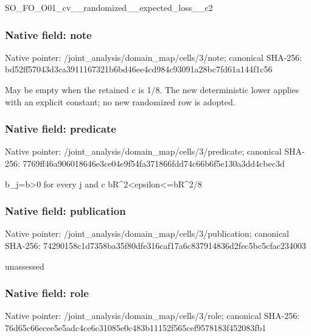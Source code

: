 \documentclass[10pt,a4paper]{article}
\begin{document}
\begingroup\raggedright\sloppy SO\_\allowbreak{}FO\_\allowbreak{}O01\_\allowbreak{}cv\_\allowbreak{}\_\allowbreak{}randomized\_\allowbreak{}\_\allowbreak{}expected\_\allowbreak{}loss\_\allowbreak{}\_\allowbreak{}c2\par\endgroup

\subsubsection{Native field: note}
Native pointer: /joint\_\allowbreak{}analysis/domain\_\allowbreak{}map/cells/3/note; canonical SHA-256: bd52ff57043d3ca3911167321b6bd46ee4cd984c93091a28bc7fd61a144f1c56

\begingroup\raggedright\sloppy May be empty when the retained c is 1/\allowbreak{}8. The new deterministic lower applies with an explicit constant;\allowbreak{} no new randomized row is adopted.\par\endgroup

\subsubsection{Native field: predicate}
Native pointer: /joint\_\allowbreak{}analysis/domain\_\allowbreak{}map/cells/3/predicate; canonical SHA-256: 7769ff46a906018646e3ce04e9f54fa371866fdd74c66b6f5e130a3dd4cbec3d

\begingroup\raggedright\sloppy b\_\allowbreak{}j=\allowbreak{}b>0 for every j and c bR\textasciicircum{}2<epsilon<=\allowbreak{}bR\textasciicircum{}2/\allowbreak{}8\par\endgroup

\subsubsection{Native field: publication}
Native pointer: /joint\_\allowbreak{}analysis/domain\_\allowbreak{}map/cells/3/publication; canonical SHA-256: 74290158c1d7358ba35f80dfe316caf17a6c837914836d2fec5bc5cfac234003

\begingroup\raggedright\sloppy unassessed\par\endgroup

\subsubsection{Native field: role}
Native pointer: /joint\_\allowbreak{}analysis/domain\_\allowbreak{}map/cells/3/role; canonical SHA-256: 76d65c66ecee5e5adc4ce6c31085e0c483b11152f565cef9578183f452083fb1
\end{document}
